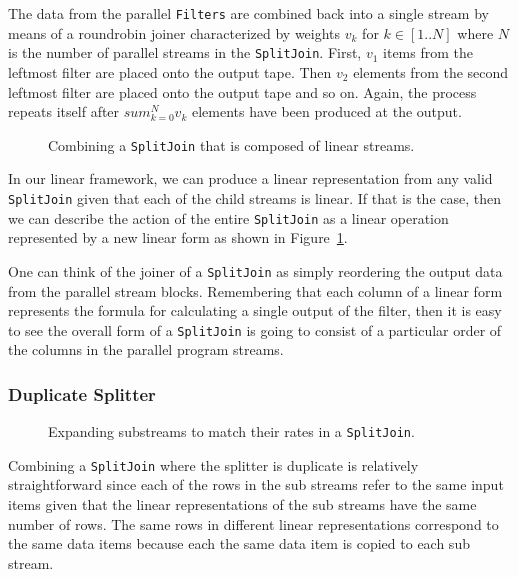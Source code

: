 The data from the parallel {\tt Filters} are combined back into a single stream by means of
a roundrobin joiner characterized by weights $v_k$ for $k\in[1..N]$ where $N$ is the number
of parallel streams in the {\tt SplitJoin}. First, $v_1$ items from the leftmost filter
are placed onto the output tape. Then $v_2$ elements from the second leftmost filter are placed
onto the output tape and so on. Again, the process repeats itself after $sum_{k=0}^{N} v_k$
elements have been produced at the output.


\begin{figure}
\center
\epsfxsize=3.0in
\caption{Combining a {\tt SplitJoin} that is composed of linear streams.}
\label{fig:splitjoin-combine}
\end{figure}

In our linear framework, we can produce a linear representation from any valid {\tt SplitJoin}
given that each of the child streams is linear. If that is the case, then we can describe the
action of the entire {\tt SplitJoin} as a linear operation represented by a new linear form
as shown in Figure~\ref{fig:splitjoin-combine}.

One can think of the joiner of a {\tt SplitJoin} as simply reordering the output data from
the parallel stream blocks. Remembering that each column of a linear form represents the 
formula for calculating a single output of the filter, then it is easy to see the overall form
of a {\tt SplitJoin} is going to consist of a particular order of the columns in the parallel
program streams.

\subsubsection{Duplicate Splitter}

\begin{figure}
\center
\epsfxsize=3.0in
\caption{Expanding substreams to match their rates in a {\tt SplitJoin}.}
\label{fig:splitjoin-duplicate-ratematch}
\end{figure}

Combining a {\tt SplitJoin} where the splitter is duplicate is relatively straightforward
since each of the rows in the sub streams refer to the same input items given that the
linear representations of the sub streams have the same number of rows. The same rows in
different linear representations correspond to the same data items because each the 
same data item is copied to each sub stream.


